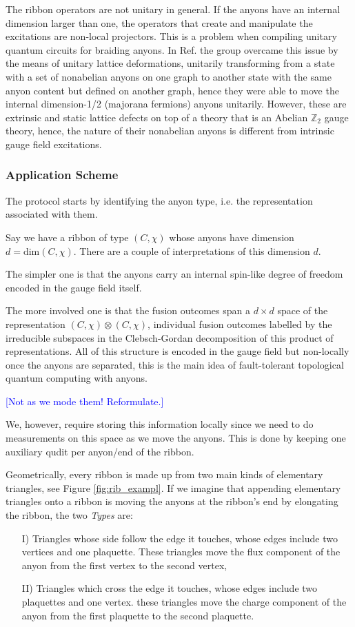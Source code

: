 \documentclass[two column]{article}
\newcommand{\jovan}[1]{\textcolor{blue}{[#1]}}
\begin{document}
The ribbon operators are not unitary in general. If the anyons have an internal dimension larger than one, the operators that create and manipulate the excitations are non-local projectors. This is a problem when compiling unitary quantum circuits for braiding anyons. In Ref. \cite{andersen2022observation} the group overcame this issue by the means of unitary lattice deformations, unitarily transforming from a state with a set of nonabelian anyons on one graph to another state with the same anyon content but defined on another graph, hence they were able to move the internal dimension-1/2 (majorana fermions) anyons unitarily. However, these are extrinsic and static lattice defects on top of a theory that is an Abelian $\mathbb Z_2$ gauge theory, hence, the nature of their nonabelian anyons is different from intrinsic gauge field excitations.

\subsubsection{Application Scheme}

The protocol starts by identifying the anyon type, i.e. the representation associated with them. 

Say we have a ribbon of type $(C, \chi)$ whose anyons have dimension $d = \text{dim}(C, \chi)$. There are a couple of interpretations of this dimension $d$.

The simpler one is that the anyons carry an internal spin-like degree of freedom encoded in the gauge field itself. 

The more involved one is that the fusion outcomes span a $d\times d$ space of the representation $(C, \chi) \otimes (C, \chi)$, individual fusion outcomes labelled by the irreducible subspaces in the Clebsch-Gordan decomposition of this product of representations. All of this structure is encoded in the gauge field but non-locally once the anyons are separated, this is the main idea of fault-tolerant topological quantum computing with anyons.

\jovan{Not as we mode them! Reformulate.}

We, however, require storing this information locally since we need to do measurements on this space as we move the anyons. This is done by keeping one auxiliary qudit per anyon/end of the ribbon.

Geometrically, every ribbon is made up from two main kinds of elementary triangles, see Figure \ref{fig:rib_exampl}. If we imagine that appending elementary triangles onto a ribbon is moving the anyons at the ribbon's end by elongating the ribbon, the two \textit{Types} are:\begin{itemize}
    \item[I)] Triangles whose side follow the edge it touches, whose edges include two vertices and one plaquette. These triangles move the flux component of the anyon from the first vertex to the second vertex,
    \item[II)] Triangles which cross the edge it touches, whose edges include two plaquettes and one vertex. these triangles move the charge component of the anyon from the first plaquette to the second plaquette.
\end{itemize}
\end{document}
